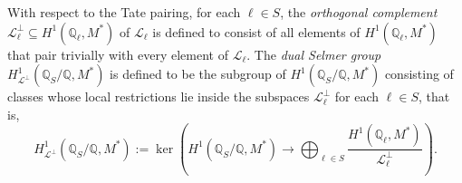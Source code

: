 \documentclass[table]{amsart}
\newcommand{\cL}{\mathcal{L}}
\numberwithin{equation}{section}
\begin{document}
With respect to the Tate pairing, for each \( \ell \in S \), the \emph{orthogonal complement} \( \mathcal{L}_\ell^\perp \subseteq H^1(\mathbb{Q}_\ell, M^*) \) of \( \mathcal{L}_\ell \) is defined to consist of all elements of \( H^1(\mathbb{Q}_\ell, M^*) \) that pair trivially with every element of \( \mathcal{L}_\ell \). The \emph{dual Selmer group} \( H^1_{\mathcal{L}^\perp}(\mathbb{Q}_S/\mathbb{Q}, M^*) \) is defined to be the subgroup of \( H^1(\mathbb{Q}_S/\mathbb{Q}, M^*) \) consisting of classes whose local restrictions lie inside the subspaces \( \mathcal{L}_\ell^\perp \) for each \( \ell \in S \), that is,
\begin{equation}\label{dselmergp}
H^1_{\mathcal{L}^\perp}(\mathbb{Q}_S/\mathbb{Q}, M^*) := \ker\left( H^1(\mathbb{Q}_S/\mathbb{Q}, M^*) \longrightarrow \bigoplus_{\ell \in S} \frac{H^1(\mathbb{Q}_\ell, M^*)}{\mathcal{L}_\ell^\perp} \right).
\end{equation}
\end{document}
